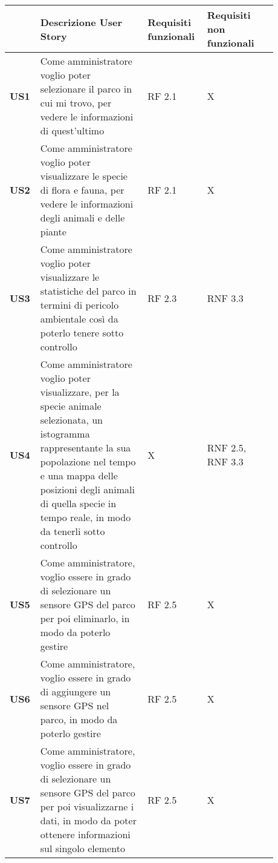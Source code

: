 \begin{table}[ht]
    \centering
    \begin{tabular}{|m{0.05\linewidth}|m{0.38\linewidth}|m{0.20\linewidth}|m{0.25\linewidth}|}
    \hline
        & \textbf{Descrizione User Story} & \textbf{Requisiti funzionali} & \textbf{Requisiti non funzionali} \\
        \hline
        \rowcolor{Gray}
        \textbf{US1} & Come amministratore voglio poter selezionare il parco in cui mi trovo, per vedere le informazioni di quest’ultimo & RF 2.1 &  X \\
        \hline
        \textbf{US2} & Come amministratore voglio poter visualizzare le specie di flora e fauna, per vedere le informazioni degli animali e delle piante & RF 2.1 & X \\
        \hline
        \rowcolor{Gray}
        \textbf{US3} & Come amministratore voglio poter visualizzare le statistiche del parco in termini di pericolo ambientale così da poterlo tenere sotto controllo & RF 2.3 & RNF 3.3 \\
        \hline
        \textbf{US4} & Come amministratore voglio poter visualizzare, per la specie animale selezionata, un istogramma rappresentante la sua popolazione nel tempo e una mappa delle posizioni degli animali di quella specie in tempo reale, in modo da tenerli sotto controllo & X & RNF 2.5, RNF 3.3 \\
        \hline
        \rowcolor{Gray}
        \textbf{US5} & Come amministratore, voglio essere in grado di selezionare un sensore GPS del parco per poi eliminarlo, in modo da poterlo gestire & RF 2.5 & X \\
        \hline 
        \textbf{US6} & Come amministratore, voglio essere in grado di aggiungere un sensore GPS nel parco, in modo da poterlo gestire & RF 2.5 & X \\
        \hline
        \rowcolor{Gray}
        \textbf{US7} & Come amministratore, voglio essere in grado di selezionare un sensore GPS del parco per poi visualizzarne i dati, in modo da poter ottenere informazioni sul singolo elemento & RF 2.5 & X \\
        \hline
    \end{tabular}
\end{table}